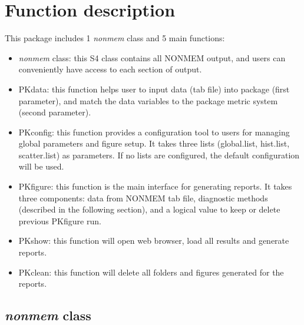 \documentclass[a4paper]{article}
\begin{document}
\section{Function description}
This package includes 1 \textit{nonmem} class and 5 main functions:
\begin{itemize}
	\item  \textit{nonmem} class: this S4 class contains all NONMEM output, and users can conveniently have access to each section of output.
	\item PKdata: this function helps user to input data (tab file) into package (first parameter), and match the data variables to the package metric system (second parameter).
	\item PKconfig: this function provides a configuration tool to users for managing global parameters and figure setup. It takes three lists (global.list, hist.list, scatter.list) as parameters.  If no lists are configured, the default configuration will be used.
	\item PKfigure: this function is the main interface for generating reports.
  It takes three components: data from NONMEM tab file, diagnostic methods (described in the following
  section), and a logical value to keep or delete previous PKfigure run.
	\item PKshow: this function will open web browser, load all results and generate reports.
	\item PKclean: this function will delete all folders and figures generated for the reports.
\end{itemize}

\subsection{\textit{nonmem} class}
\end{document}
